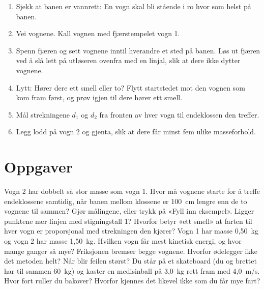 \documentclass[11pt]{article}
\begin{document}
\begin{enumerate}
\item Sjekk at banen er vannrett: En vogn skal bli stående i ro hvor som helst på banen.
\item Vei vognene. Kall vognen med fjærstempelet vogn 1.
\item Spenn fjæren og sett vognene inntil hverandre et sted på banen. Løs ut fjæren ved å slå lett på utløseren ovenfra med en linjal, slik at dere ikke dytter vognene.
\item Lytt: Hører dere ett smell eller to? Flytt startstedet mot den vognen som kom fram først, og prøv igjen til dere hører ett smell.
\item Mål strekningene $d_{1}$ og $d_{2}$ fra fronten av hver vogn til endeklossen den treffer.
\item Legg lodd på vogn 2 og gjenta, slik at dere får minst fem ulike masseforhold.
\end{enumerate}

\section*{Oppgaver}

\begin{oppgaveliste}
\oppgave {}Vogn 2 har dobbelt så stor masse som vogn 1. Hvor må vognene starte for å treffe endeklossene samtidig, når banen mellom klossene er 100~cm lengre enn de to vognene til sammen?
\svar
\oppgave {}Gjør målingene, eller trykk på «Fyll inn eksempel». Ligger punktene nær linjen med stigningstall 1?
\svar
\oppgave {}Hvorfor betyr «ett smell» at farten til hver vogn er proporsjonal med strekningen den kjører?
\svar
\oppgave {}Vogn 1 har masse 0,50~kg og vogn 2 har masse 1,50~kg. Hvilken vogn får mest kinetisk energi, og hvor mange ganger så mye?
\svar
\oppgave {}Friksjonen bremser begge vognene. Hvorfor ødelegger ikke det metoden helt? Når blir feilen størst?
\svar
\oppgave {}Du står på et skateboard (du og brettet har til sammen 60~kg) og kaster en medisinball på 3,0~kg rett fram med 4,0~m/s. Hvor fort ruller du bakover? Hvorfor kjennes det likevel ikke som du får mye fart?
\svar
\end{oppgaveliste}
\end{document}
